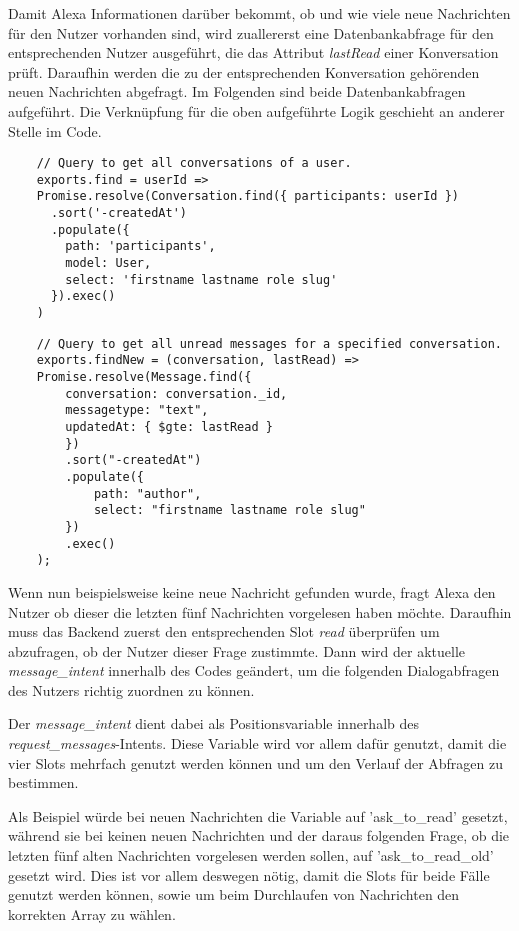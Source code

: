 Damit Alexa Informationen darüber bekommt, ob und wie viele neue Nachrichten für den Nutzer vorhanden sind, wird zuallererst eine Datenbankabfrage für den entsprechenden Nutzer ausgeführt, die das Attribut \textit{lastRead} einer Konversation prüft. Daraufhin werden die zu der entsprechenden Konversation gehörenden neuen Nachrichten abgefragt. Im Folgenden sind beide Datenbankabfragen aufgeführt. Die Verknüpfung für die oben aufgeführte Logik geschieht an anderer Stelle im Code.
\begin{lstlisting}
    // Query to get all conversations of a user.
    exports.find = userId =>
    Promise.resolve(Conversation.find({ participants: userId })
      .sort('-createdAt')
      .populate({
        path: 'participants',
        model: User,
        select: 'firstname lastname role slug'
      }).exec()
    )
\end{lstlisting}
\begin{lstlisting}
    // Query to get all unread messages for a specified conversation.
    exports.findNew = (conversation, lastRead) =>
    Promise.resolve(Message.find({
        conversation: conversation._id,
        messagetype: "text",
        updatedAt: { $gte: lastRead }
        })
        .sort("-createdAt")
        .populate({
            path: "author",
            select: "firstname lastname role slug"
        })
        .exec()
    );
\end{lstlisting}

Wenn nun beispielsweise keine neue Nachricht gefunden wurde, fragt Alexa den Nutzer ob dieser die letzten fünf Nachrichten vorgelesen haben möchte. Daraufhin muss das Backend zuerst den entsprechenden Slot \textit{read} überprüfen um abzufragen, ob der Nutzer dieser Frage zustimmte.
Dann wird der aktuelle \textit{message\_intent} innerhalb des Codes geändert, um die folgenden Dialogabfragen des Nutzers richtig zuordnen zu können.

Der \textit{message\_intent} dient dabei als Positionsvariable innerhalb des \textit{request\_messages}-Intents.
Diese Variable wird vor allem dafür genutzt, damit die vier Slots mehrfach genutzt werden können und um den Verlauf der Abfragen zu bestimmen.

Als Beispiel würde bei neuen Nachrichten die Variable auf 'ask\_to\_read' gesetzt, während sie bei keinen neuen Nachrichten und der daraus folgenden Frage, ob die letzten fünf alten Nachrichten vorgelesen werden sollen, auf 'ask\_to\_read\_old' gesetzt wird. Dies ist vor allem deswegen nötig, damit die Slots für beide Fälle genutzt werden können, sowie um beim Durchlaufen von Nachrichten den korrekten Array zu wählen.


